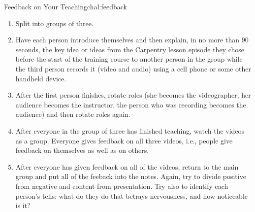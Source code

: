\begin{challenge}{Feedback on Your Teaching}{chal:feedback}

\begin{enumerate}

\item
  Split into groups of three.

\item
  Have each person introduce themselves and then explain, in no more
  than 90 seconds, the key idea or ideas from the Carpentry lesson
  episode they chose before the start of the training course to another
  person in the group while the third person records it (video and
  audio) using a cell phone or some other handheld device.

\item
  After the first person finishes, rotate roles (she becomes the
  videographer, her audience becomes the instructor, the person who was
  recording becomes the audience) and then rotate roles again.

\item
  After everyone in the group of three has finished teaching, watch the
  videos as a group. Everyone gives feedback on all three videos, i.e.,
  people give feedback on themselves as well as on others.

\item
  After everyone has given feedback on all of the videos, return to the
  main group and put all of the feeback into the notes.  Again, try to
  divide positive from negative and content from presentation.  Try
  also to identify each person's tells: what do they do that betrays
  nervousness, and how noticeable is it?

\end{enumerate}

\end{challenge}
